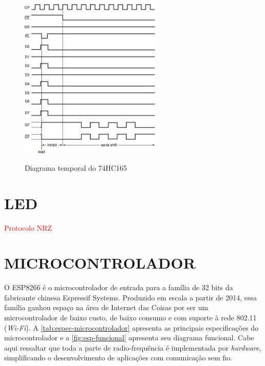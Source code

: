 \begin{figure}[!htb]
    \centering
    \caption{Diagrama temporal do 74HC165}
    \includegraphics[width=0.6\textwidth]{./dados/figuras/shift-temporal}
    \label{fig:shift-temporal}
\end{figure}

\section{LED}
\label{sec:led}

\textcolor{red}{Protocolo NRZ}

\section{MICROCONTROLADOR}
\label{sec:microcontrolador}

O ESP8266 é o microcontrolador de entrada para a família de 32 bits da fabricante chinesa Espressif Systems. Produzido em escala a partir de 2014, essa família ganhou espaço na área de Internet das Coisas por ser um microcontrolador de baixo custo, de baixo consumo e com suporte à rede 802.11 (\emph{Wi-Fi}). A \autoref{tab:espec-microcontrolador} apresenta as principais especificações do microcontrolador e a \autoref{fig:esp-funcional} apresenta seu diagrama funcional. Cabe aqui ressaltar que toda a parte de radio-frequência é implementada por \emph{hardware}, simplificando o desenvolvimento de aplicações com comunicação sem fio.




